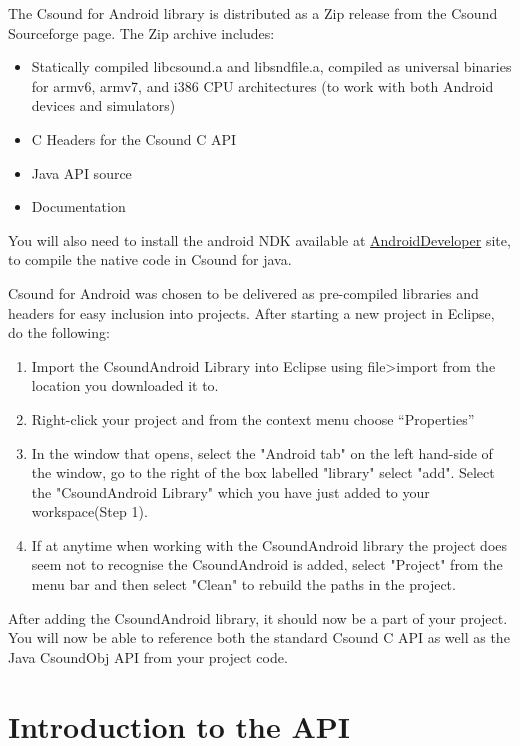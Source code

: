 \documentclass[11pt]{article}
\begin{document}
The Csound for Android library is distributed as a Zip release from the Csound Sourceforge page. The Zip archive includes:

\begin{itemize}
\item Statically compiled libcsound.a and libsndfile.a, compiled as universal binaries for armv6, armv7, and i386 CPU architectures (to work with both Android devices and simulators)
\item C Headers for the Csound C API
\item Java API source
\item Documentation
\end{itemize} 

You will also need to install the android NDK available at \href{http://developer.android.com}{AndroidDeveloper} site, to compile the native code in Csound for java.

Csound for Android was chosen to be delivered as pre-compiled libraries and headers for easy inclusion into projects.  After starting a new project in Eclipse, do the following:

\begin{enumerate}
\item Import the CsoundAndroid Library into Eclipse using file>import from the location you downloaded it to.
\item Right-click your project and from the context menu choose ``Properties''
\item In the window that opens, select the "Android tab" on the left hand-side of the window,  go to the right of the box labelled "library" select "add". Select the "CsoundAndroid Library" which you have just added to your workspace(Step 1).
\item If at anytime when working with the CsoundAndroid library the project does seem not to recognise the CsoundAndroid is added, select "Project" from the menu bar and then select "Clean" to rebuild the paths in the project. 
\end{enumerate}

After adding the CsoundAndroid library, it should now be a part of your project. You will now be able to reference both the standard Csound C API as well as the Java CsoundObj API from your project code.


\section{Introduction to the API}
\end{document}
